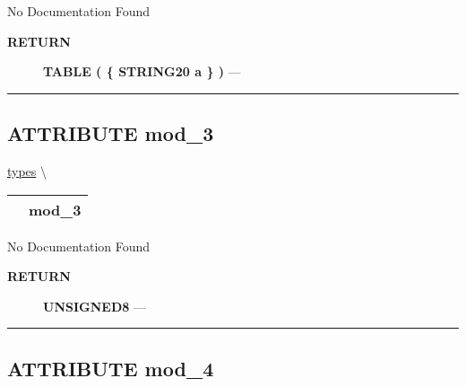 \par





No Documentation Found








\par
\begin{description}
\item [\colorbox{tagtype}{\color{white} \textbf{\textsf{RETURN}}}] \textbf{TABLE ( \{ STRING20 a \} )} --- 
\end{description}




\rule{\linewidth}{0.5pt}
\subsection*{\textsf{\colorbox{headtoc}{\color{white} ATTRIBUTE}
mod\_3}}

\hypertarget{ecldoc:ecldoc-mod_3}{}
\hspace{0pt} \hyperlink{ecldoc:types}{types} \textbackslash 

{\renewcommand{\arraystretch}{1.5}
\begin{tabularx}{\textwidth}{|>{\raggedright\arraybackslash}l|X|}
\hline
\hspace{0pt}\mytexttt{\color{red} } & \textbf{mod\_3} \\
\hline
\end{tabularx}
}

\par





No Documentation Found








\par
\begin{description}
\item [\colorbox{tagtype}{\color{white} \textbf{\textsf{RETURN}}}] \textbf{UNSIGNED8} --- 
\end{description}




\rule{\linewidth}{0.5pt}
\subsection*{\textsf{\colorbox{headtoc}{\color{white} ATTRIBUTE}
mod\_4}}

